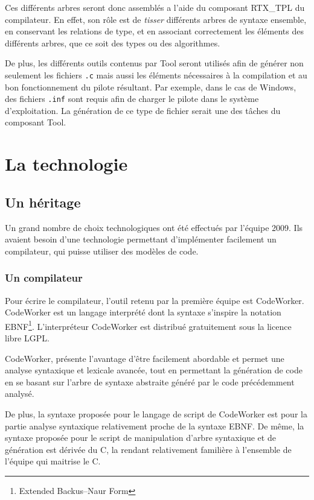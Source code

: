 \documentclass{rtxreport}
\begin{document}
Ces différents arbres seront donc assemblés a l'aide du composant
RTX\_TPL du compilateur. En effet, son rôle est de \emph{tisser} différents
arbres de syntaxe ensemble, en conservant les relations de type, et en
associant correctement les éléments des différents arbres, que ce soit des
types ou des algorithmes.

De plus, les différents outils contenus par Tool seront utilisés afin
de générer non seulement les fichiers \texttt{.c} mais aussi les éléments
nécessaires à la compilation et au bon fonctionnement du pilote résultant.
Par exemple, dans le cas de Windows, des fichiers \texttt{.inf} sont requis
afin de charger le pilote dans le système d'exploitation. La génération de ce
type de fichier serait une des tâches du composant Tool.


\chapter{La technologie \rtx}

\section{Un héritage}

Un grand nombre de choix technologiques ont été effectués par l'équipe 2009.
Ils avaient besoin d'une technologie permettant d'implémenter facilement un
compilateur, qui puisse utiliser des modèles de code.

\subsection{Un compilateur}

Pour écrire le compilateur, l'outil retenu par la première équipe est
CodeWorker. CodeWorker est un langage interprété dont la syntaxe s'inspire la
notation EBNF\footnote{Extended Backus--Naur Form}. L'interpréteur CodeWorker
est distribué gratuitement sous la licence libre LGPL\cite{LGPL21}.

CodeWorker, présente l'avantage d'être facilement abordable et permet une
analyse syntaxique et lexicale avancée, tout en permettant la génération de
code en se basant sur l'arbre de syntaxe abstraite généré par le code
précédemment analysé.

De plus, la syntaxe proposée pour le langage de script de CodeWorker est pour
la partie analyse syntaxique relativement proche de la syntaxe EBNF. De même,
la syntaxe proposée pour le script de manipulation d'arbre syntaxique et de
génération est dérivée du C, la rendant relativement familière à l'ensemble de
l'équipe qui maitrise le C.
\end{document}
